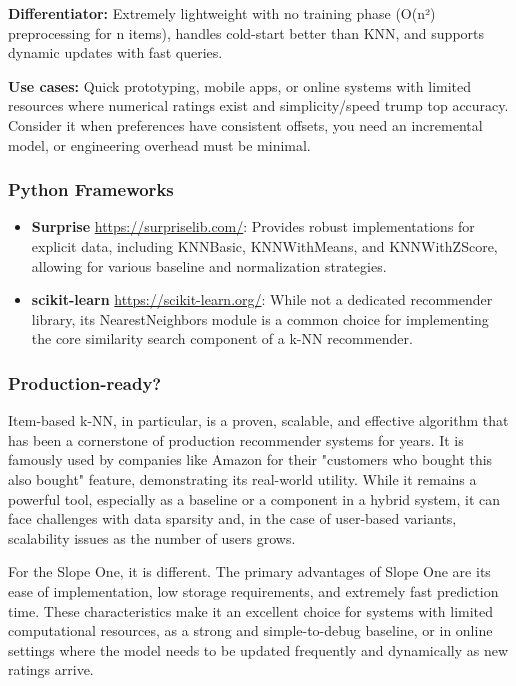 \documentclass{article}
\begin{document}
\noindent\textbf{Differentiator:} Extremely lightweight with no training phase (O(n²) preprocessing for n items), handles cold-start better than KNN, and supports dynamic updates with fast queries. 

\noindent\textbf{Use cases:} Quick prototyping, mobile apps, or online systems with limited resources where numerical ratings exist and simplicity/speed trump top accuracy. Consider it when preferences have consistent offsets, you need an incremental model, or engineering overhead must be minimal.

    \subsubsection*{Python Frameworks}
    \begin{itemize}
        \item \textbf{Surprise} \url{https://surpriselib.com/}: Provides robust implementations for explicit data, including KNNBasic, KNNWithMeans, and KNNWithZScore, allowing for various baseline and normalization strategies.
        \item \textbf{scikit-learn} \url{https://scikit-learn.org/}: While not a dedicated recommender library, its NearestNeighbors module is a common choice for implementing the core similarity search component of a k-NN recommender.
    \end{itemize}

    \subsubsection*{Production-ready?}
    Item-based k-NN, in particular, is a proven, scalable, and effective algorithm that has been a cornerstone of production recommender systems for years. It is famously used by companies like Amazon for their "customers who bought this also bought" feature, demonstrating its real-world utility. While it remains a powerful tool, especially as a baseline or a component in a hybrid system, it can face challenges with data sparsity and, in the case of user-based variants, scalability issues as the number of users grows.

    For the Slope One, it is different. The primary advantages of Slope One are its ease of implementation, low storage requirements, and extremely fast prediction time. These characteristics make it an excellent choice for systems with limited computational resources, as a strong and simple-to-debug baseline, or in online settings where the model needs to be updated frequently and dynamically as new ratings arrive. 
\end{document}
